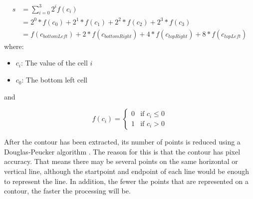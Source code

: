 \newenvironment{conditions}
  {\par\vspace{\abovedisplayskip}\noindent\begin{tabular}{>{$}l<{$} @{${}={}$} l}}
  {\end{tabular}\par\vspace{\belowdisplayskip}}

\begin{equation}
\begin{split}
	s	&= \displaystyle\sum_{i=0}^3 2^i f(c_i) \\
		&= 2^0 * f(c_0) + 2^1 * f(c_1) + 2^2 * f(c_2) + 2^3 * f(c_3) \\
		&= f(c_{bottomLeft}) + 2 * f(c_{bottomRight}) + 4 * f(c_{topRight}) + 8 * f(c_{topLeft})
	\label{equ:challenges:marching_squares_state}
\end{split}
\end{equation}
where:
\begin{itemize}[label=]
    \item $c_i$: The value of the cell $i$
    \item $c_0$: The bottom left cell
\end{itemize}

and

\[ f(c_i) =
  \begin{cases}
    0  & \text{if $c_i \leq 0$}\\
    1  & \text{if $c_i > 0$}
  \end{cases}
\]

After the contour has been extracted, its number of points is reduced using a Douglas-Peucker algorithm \cite{Douglas.1973}. The reason for this is that the contour has pixel accuracy. That means there may be several points on the same horizontal or vertical line, although the startpoint and endpoint of each line would be enough to represent the line. In addition, the fewer the points that are represented on a contour, the faster the processing will be.

